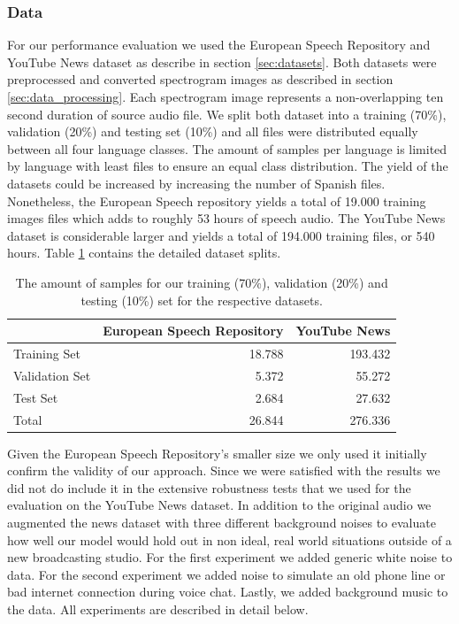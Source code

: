 \subsubsection{Data} 
\label{sec:data}
For our performance evaluation we used the European Speech Repository and YouTube News dataset as describe in section \ref{sec:datasets}. Both datasets were preprocessed and converted spectrogram images as described in section \ref{sec:data_processing}. Each spectrogram image represents a non-overlapping ten second duration of source audio file. 
We split both dataset into a training (70\%), validation (20\%) and testing set (10\%) and all files were distributed equally between all four language classes. The amount of samples per language is limited by language with least files to ensure an equal class distribution. The yield of the datasets could be increased by increasing the number of Spanish files. Nonetheless, the European Speech repository yields a total of 19.000 training images files which adds to roughly 53 hours of speech audio. The YouTube News dataset is considerable larger and yields a total of 194.000 training files, or 540 hours. Table \ref{tab:data_splits} contains the detailed dataset splits.

	\begin{table}[]
	\centering
	\begin{tabularx}{\textwidth}{lrr}
	\toprule
	  				& European Speech Repository & YouTube News\\ \midrule
	Training Set    & 18.788						 & 193.432 \\
	Validation Set  & 5.372						 & 55.272 \\
	Test Set        & 2.684						 & 27.632 \\
	\midrule
	Total           & 26.844						 & 276.336 \\
	\bottomrule
	\end{tabularx}
	\caption{The amount of samples for our training (70\%), validation (20\%) and testing (10\%) set for the respective datasets.}
	\label{tab:data_splits}
	\end{table}

Given the European Speech Repository's smaller size we only used it initially confirm the validity of our approach. Since we were satisfied with the results we did not do include it in the extensive robustness tests that we used for the evaluation on the YouTube News dataset. In addition to the original audio we augmented the news dataset with three different background noises to evaluate how well our model would hold out in non ideal, real world situations outside of a new broadcasting studio. For the first experiment we added generic white noise to data. For the second experiment we added noise to simulate an old phone line or bad internet connection during voice chat. Lastly, we added background music to the data. All experiments are described in detail below.


